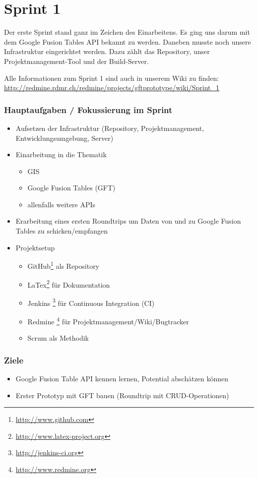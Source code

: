 \section{Sprint 1}

Der erste Sprint stand ganz im Zeichen des Einarbeitens. Es ging uns darum mit dem Google Fusion Tables \gls{API} bekannt zu werden. Daneben musste noch unsere Infrastruktur eingerichtet werden. Dazu zählt das Repository, unser Projektmanagement-Tool und der Build-Server.

Alle Informationen zum Sprint 1 sind auch in unserem Wiki zu finden:
\url{http://redmine.rdmr.ch/redmine/projects/gftprototype/wiki/Sprint_1}

\subsubsection{Hauptaufgaben / Fokussierung im Sprint}

\begin{itemize}
	\item Aufsetzen der Infrastruktur (Repository, Projektmanagement, Entwicklungsumgebung, Server)
	\item Einarbeitung in die Thematik
	\begin{itemize}
		\item \gls{GIS}
		\item Google Fusion Tables (GFT)
		\item allenfalls weitere \gls{API}s
	\end{itemize}
	\item Erarbeitung eines ersten Roundtrips um Daten von und zu Google Fusion Tables zu schicken/empfangen
	\item Projektsetup
	\begin{itemize}
		\item GitHub\footnote{\url{http://www.github.com}} als Repository
		\item LaTex\footnote{\url{http://www.latex-project.org}} für Dokumentation
		\item Jenkins \footnote{\url{http://jenkins-ci.org}} für Continuous Integration (CI)
		\item Redmine \footnote{\url{http://www.redmine.org}} für Projektmanagement/Wiki/Bugtracker
		\item Scrum als Methodik
	\end{itemize}
\end{itemize}

\subsubsection{Ziele}
\begin{itemize}
	\item Google Fusion Table \gls{API} kennen lernen, Potential abschätzen können
	\item Erster Prototyp mit GFT bauen (Roundtrip mit CRUD-Operationen)
\end{itemize}

